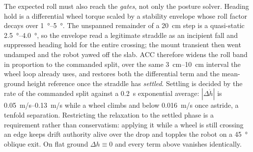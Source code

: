 \documentclass[a4paper,fleqn]{cas-dc}
\begin{document}
The expected roll must also reach the \emph{gates}, not only the posture solver.
Heading hold is a differential wheel torque scaled by a stability envelope whose
roll factor decays over \SIrange{1}{5}{\degree}. The unspanned remainder of a
\SI{20}{cm} step is a quasi-static \SIrange{2.5}{4.0}{\degree}, so the envelope
read a legitimate straddle as an incipient fall and suppressed heading hold for the entire crossing; the mount transient then went undamped and the robot yawed
off the slab. ACC therefore widens the roll band in proportion to the commanded
split, over the same \SIrange{3}{10}{cm} interval the wheel loop already uses,
and restores both the differential term and the mean-ground height reference once
the straddle has \emph{settled}. Settling is decided by the rate of the commanded
split against a \SI{0.2}{s} exponential average: $|\Delta \dot h|$ is
\SIrange{0.05}{0.13}{m/s} while a wheel climbs and below \SI{0.016}{m/s} once
astride, a tenfold separation. Restricting the relaxation to the settled phase is
a requirement rather than conservatism: applying it while a wheel is still
crossing an edge keeps drift authority alive over the drop and topples the robot
on a \SI{45}{\degree} oblique exit. On flat ground $\Delta h \equiv 0$ and every
term above vanishes identically.
\end{document}
